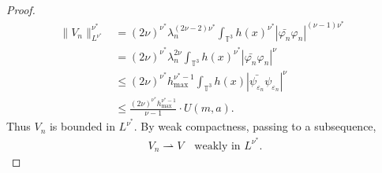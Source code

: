 \documentclass[11pt,final]{amsart}
\newcommand{\T}{\mathbb{T}}
\newcommand{\dd}{\mathop{}\!\mathrm{d}}
\newcommand{\eps}{\varepsilon}
\DeclareMathOperator{\dv}{\dd{vol}}
\begin{document}
\begin{proof}
\begin{align}
\|V_n\|^{\nu^*}_{L^{\nu^*}}&=(2\nu)^{\nu^*}\lambda_n^{(2\nu-2)\nu^*}\int_{\T^3}h(x)^{\nu^*}|\bar{\varphi_n}\varphi_n|^{(\nu-1)\nu^*}\dv\\
&=(2\nu)^{\nu^*}\lambda_n^{2\nu}\int_{\T^3}h(x)^{\nu^*}|\bar{\varphi_n}\varphi_n|^{\nu}\dv\\
&\leq (2\nu)^{\nu^*}h_{\max}^{\nu^*-1}\int_{\T^3}h(x)|\bar{\psi_{\eps_n}}\psi_{\eps_n}|^{\nu}\dv\\
&\leq \frac{(2\nu)^{\nu^*}h_{\max}^{\nu^*-1}}{\nu-1}\cdot U(m,a).
\end{align}
Thus ${V_n}$ is bounded in $L^{\nu^*}$. By weak compactness, passing to a subsequence,
\begin{align}
V_n\rightharpoonup V
\quad\text{weakly in }L^{\nu^*}.
\end{align}


\end{proof}
\end{document}
